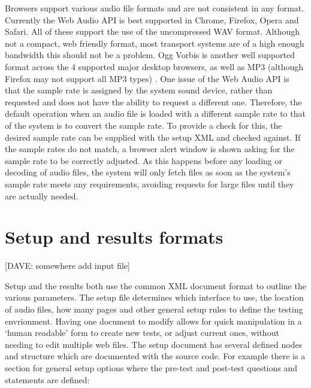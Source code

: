 \documentclass{article}
\begin{document}
Browsers support various audio file formats and are not consistent in any format. Currently the Web Audio API is best supported in Chrome, Firefox, Opera and Safari. All of these support the use of the uncompressed WAV format. Although not a compact, web friendly format, most transport systems are of a high enough bandwidth this should not be a problem. Ogg Vorbis is another well supported format across the 4 supported major desktop browsers, as well as MP3 (although Firefox may not support all MP3 types) \cite{mozdevSupportedMedia}. %
One issue of the Web Audio API is that the sample rate is assigned by the system sound device, rather than requested and does not have the ability to request a different one. %
 Therefore, the default operation when an audio file is loaded with a different sample rate to that of the system is to convert the sample rate. To provide a check for this, the desired sample rate can be supplied with the setup XML and checked against. If the sample rates do not match, a browser alert window is shown asking for the sample rate to be correctly adjusted. 
As this happens before any loading or decoding of audio files, the system will only fetch files as soon as the system's sample rate meets any requirements, avoiding requests for large files until they are actually needed.


\section{Setup and results formats}\label{sec:setupresultsformats}

[DAVE: somewhere add input file]

Setup and the results both use the common XML document format to outline the various parameters. The setup file determines which interface to use, the location of audio files, how many pages and other general setup rules to define the testing envrionment. Having one document to modify allows for quick manipulation in a `human readable' form to create new tests, or adjust current ones, without needing to edit multiple web files. %
The setup document has several defined nodes and structure which are documented with the source code. For example there is a section for general setup options where the pre-test and post-test questions and statements are defined:
\end{document}
